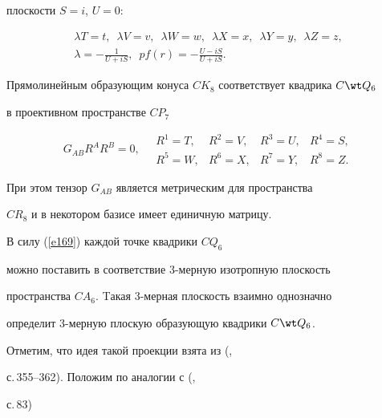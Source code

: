 плоскости $S=i$, $U=0$:


\begin{gather*}


\lambda T=t,\ \; \lambda V=v,\ \; \lambda W=w, \ \;


\lambda X=x,\ \; \lambda Y=y, \ \; \lambda Z=z, \\


\lambda =-\frac{1}{U+iS}, \ \;


pf(r)=-\frac{U-iS}{U+iS}.


\end{gather*}


Прямолинейным образующим конуса $CK_8$ соответствует квадрика $C\wt Q_6$


в проективном пространстве $CP_7$


$$


\label{e179}


G_{AB}R^AR^B=0,\quad


\begin{matrix}


R^1=T, & R^2=V, & R^3=U, & R^4=S, \\


R^5=W, & R^6=X, & R^7=Y, & R^8=Z.


\end{matrix}


$$


При этом тензор $G_{AB}$ является метрическим для пространства


$CR_8$ и в некотором базисе имеет единичную матрицу.


В силу (\ref{e169}) каждой точке квадрики $CQ_6$


можно поставить в соответствие 3-мерную изотропную плоскость


пространства $CA_6$. Tакая 3-мерная плоскость взаимно однозначно


определит 3-мерную плоскую образующую квадрики $C\wt Q_6$.


Отметим, что идея такой проекции взята из (\cite{Pen1},


с.\,355--362). Положим по аналогии с (\cite{Pen1},


с.\,83)


